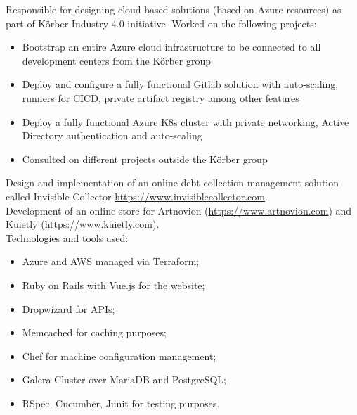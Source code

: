 \documentclass[a4paper,10pt]{memoir} %
\begin{document}

{Responsible for designing cloud based solutions (based on Azure resources) as part of Körber Industry 4.0 initiative. Worked on the following projects:
\begin{itemize}
  \item Bootstrap an entire Azure cloud infrastructure to be connected to all development centers from the Körber group
  \item Deploy and configure a fully functional Gitlab solution with auto-scaling, runners for CICD, private artifact registry among other features
  \item Deploy a fully functional Azure K8s cluster with private networking, Active Directory authentication and auto-scaling
  \item Consulted on different projects outside the Körber group
\end{itemize}
}


{Design and implementation of an online debt collection management solution called Invisible Collector
\url{https://www.invisiblecollector.com}. \\
Development of an online store for Artnovion (\url{https://www.artnovion.com}) and Kuietly (\url{https://www.kuietly.com}). \\
Technologies and tools used:
\begin{itemize}
  \item Azure and AWS managed via Terraform;
  \item Ruby on Rails with Vue.js for the website;
  \item Dropwizard for APIs;
  \item Memcached for caching purposes;
  \item Chef for machine configuration management;
  \item Galera Cluster over MariaDB and PostgreSQL;
  \item RSpec, Cucumber, Junit for testing purposes.
\end{itemize}
}

\end{document}
